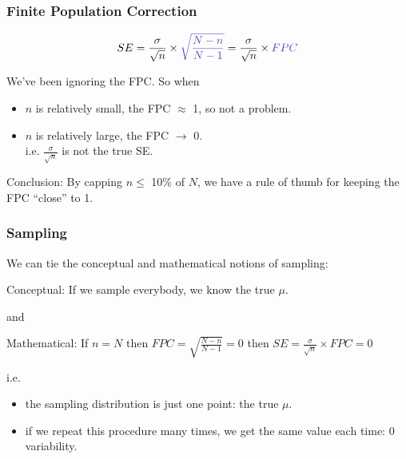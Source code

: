 \documentclass[handout]{beamer}
\newcommand{\blue}[1]{\textcolor{blue2}{#1}}
\begin{document}
\begin{frame}[fragile]
\frametitle{Finite Population Correction}
%
%

\[
SE = \frac{\sigma}{\sqrt{n}} \times \blue{\sqrt{\frac{N-n}{N-1}}} =
\frac{\sigma}{\sqrt{n}} \times \blue{FPC}
\]

\vspace{0.25cm}
\pause
We've been ignoring the \blue{FPC}.  So when 
\begin{itemize}
\pause\item $n$ is relatively small, the FPC $\approx$ 1, so not a problem.
\pause\item $n$ is relatively large, the FPC $\longrightarrow$ 0.\\
i.e. $\frac{\sigma}{\sqrt{n}}$ is not the true SE.  
\end{itemize}

\vspace{0.25cm}
\pause Conclusion:  By capping $n \leq $ 10\% of $N$, we have a \blue{rule of thumb} for keeping the FPC ``close'' to 1.  

\end{frame}


\begin{frame}[fragile]
\frametitle{Sampling}
We can tie the \blue{conceptual} and \blue{mathematical} notions of sampling:  

\vspace{0.25cm}
\pause
\blue{Conceptual}:  If we sample everybody, we know the true $\mu$.
\begin{center}
\pause and
\end{center}
\blue{Mathematical}:  
If $n=N$ then $FPC = \sqrt{\frac{N-n}{N-1}} = 0$ then $SE = \frac{\sigma}{\sqrt{n}}\times FPC = 0$


\vspace{0.25cm}
\pause
i.e. 
\begin{itemize}
\item the sampling distribution is just one point: the true $\mu$.
\item if we repeat this procedure many times, we get the same value each time: 0 variability.
\end{itemize}


\end{frame}
\end{document}
